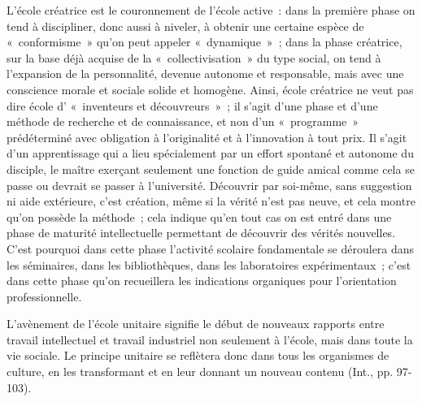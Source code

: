 \documentclass[french,twoside]{book} %
\begin{document}
L'école créatrice est le couronnement de l’école active : dans la première phase on tend à discipliner, donc aussi à niveler, à obtenir une certaine espèce de « conformisme » qu’on peut appeler « dynamique » ; dans la phase créatrice, sur la base déjà acquise de la « collectivisation » du type social, on tend à l’expansion de la personnalité, devenue autonome et responsable, mais avec une conscience morale et sociale solide et homogène. Ainsi, école créatrice ne veut pas dire école d’ « inventeurs et découvreurs » ; il s’agit d’une phase et d’une méthode de recherche et de connaissance, et non d’un « programme » prédéterminé avec obligation à l’originalité et à l’innovation à tout prix. Il s’agit d’un apprentissage qui a lieu spécialement par un effort spontané et autonome du disciple, le maître exerçant seulement une fonction de guide amical comme cela se passe ou devrait se passer à l’université. Découvrir par soi-même, sans suggestion ni aide extérieure, c’est création, même si la vérité n’est pas neuve, et cela montre qu’on possède la méthode ; cela indique qu’en tout cas on est entré dans une phase de maturité intellectuelle permettant de découvrir des vérités nouvelles. C'est pourquoi dans cette phase l’activité scolaire fondamentale se déroulera dans les séminaires, dans les bibliothèques, dans les laboratoires expérimentaux ; c’est dans cette phase qu’on recueillera les indications organiques pour l’orientation professionnelle.\par
L'avènement de l’école unitaire signifie le début de nouveaux rapports entre travail intellectuel et travail industriel non seulement à l’école, mais dans toute la vie sociale. Le principe unitaire se reflètera donc dans tous les organismes de culture, en les transformant et en leur donnant un nouveau contenu (Int., pp. 97-103).\par
{\raggedleft \noindent [1930]}
\end{document}
